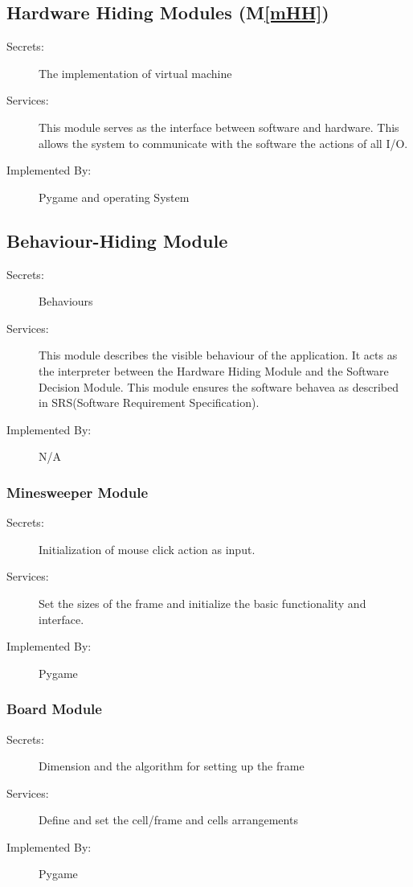 \documentclass[12pt, titlepage]{article}
\newcommand{\mref}[1]{M\ref{#1}}
\begin{document}
\subsection{Hardware Hiding Modules (\mref{mHH})}
\begin{description}
\item[Secrets:] The implementation of virtual machine
\item[Services:] This module serves as the interface between software and hardware. This allows the system to communicate with the software the actions of all I/O.
\item[Implemented By:] Pygame and operating System
\end{description}

\subsection{Behaviour-Hiding Module}
\begin{description}
\item[Secrets:]Behaviours
\item[Services:] This module describes the visible behaviour of the application. It acts as the interpreter between
the Hardware Hiding Module and the Software Decision Module. This module ensures the software behavea as described in SRS(Software Requirement Specification).
\item[Implemented By:] N/A
\end{description}

\subsubsection{Minesweeper Module}
\begin{description}
\item[Secrets:] Initialization of mouse click action as input.
\item[Services:] Set the sizes of the frame and initialize the basic functionality and interface.
\item[Implemented By:] Pygame
\end{description}

\subsubsection{Board Module}
\begin{description}
\item[Secrets:] Dimension and the algorithm for setting up the frame
\item[Services:] Define and set the cell/frame and cells arrangements
\item[Implemented By:] Pygame
\end{description}
\end{document}
